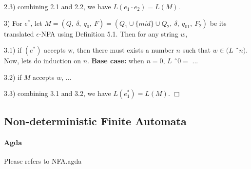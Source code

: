\documentclass[twoside,openright,final]{bhamthesis}
\begin{document}
\par 2.3) combining 2.1 and 2.2, we have \(L(e_1 \cdot e_2) = L(M)\). 

\par 3) For \(e^*\), let \(M = (Q,\ \delta,\ q_0,\ F) = (Q_1 \cup \{mid\} \cup Q_2,\ \delta,\ q_{01},\ F_2)\) be its
translated \(\epsilon\)-NFA using Definition 5.1. Then for any string
\(w\), 

\par 3.1) if \((e^*)\) accepts w, then there must exists a number
\(n\) such that \(w \in (L\) \^\ \(n)\). Now, lets do induction on
\(n\). \textbf{Base case:} when \(n = 0\), \(L\) \^\ \(0 = \) ...

\par 3.2) if \(M\) accepts \(w\), ... 

\par 3.3) combining 3.1 and 3.2, we have \(L(e_1^*) =
L(M)\). \(\Box\)

\subsection{Non-deterministic Finite Automata}

\paragraph{Agda} Please refers to NFA.agda \\
\end{document}
